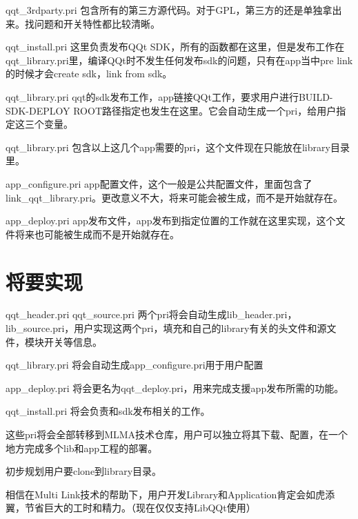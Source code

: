 \begin{DoxyEnumerate}
\item qqt\+\_\+3rdparty.\+pri 包含所有的第三方源代码。对于\+G\+P\+L，第三方的还是单独拿出来。找问题和开关特性都比较清晰。
\item qqt\+\_\+install.\+pri 这里负责发布\+Q\+Qt S\+D\+K，所有的函数都在这里，但是发布工作在qqt\+\_\+library.\+pri里，编译\+Q\+Qt时不发生任何发布sdk的问题，只有在app当中pre link的时候才会create sdk，link from sdk。
\item qqt\+\_\+library.\+pri qqt的sdk发布工作，app链接\+Q\+Qt工作，要求用户进行\+B\+U\+I\+L\+D-\/\+S\+D\+K-\/\+D\+E\+P\+L\+OY R\+O\+O\+T路径指定也发生在这里。它会自动生成一个pri，给用户指定这三个变量。
\item qqt\+\_\+library.\+pri 包含以上这几个app需要的pri，这个文件现在只能放在library目录里。
\item app\+\_\+configure.\+pri app配置文件，这个一般是公共配置文件，里面包含了link\+\_\+qqt\+\_\+library.\+pri。更改意义不大，将来可能会被生成，而不是开始就存在。
\item app\+\_\+deploy.\+pri app发布文件，app发布到指定位置的工作就在这里实现，这个文件将来也可能被生成而不是开始就存在。
\end{DoxyEnumerate}

\section*{将要实现}


\begin{DoxyItemize}
\item qqt\+\_\+header.\+pri qqt\+\_\+source.\+pri 两个pri将会自动生成lib\+\_\+header.\+pri，lib\+\_\+source.\+pri，用户实现这两个pri，填充和自己的library有关的头文件和源文件，模块开关等信息。
\item qqt\+\_\+library.\+pri 将会自动生成app\+\_\+configure.\+pri用于用户配置
\item app\+\_\+deploy.\+pri 将会更名为qqt\+\_\+deploy.\+pri，用来完成支援app发布所需的功能。
\item qqt\+\_\+install.\+pri 将会负责和sdk发布相关的工作。
\item 这些pri将会全部转移到\+M\+L\+M\+A技术仓库，用户可以独立将其下载、配置，在一个地方完成多个lib和app工程的部署。
\begin{DoxyItemize}
\item 初步规划用户要clone到library目录。
\end{DoxyItemize}
\end{DoxyItemize}

相信在\+Multi Link技术的帮助下，用户开发\+Library和\+Application肯定会如虎添翼，节省巨大的工时和精力。（现在仅仅支持\+Lib\+Q\+Qt使用）

